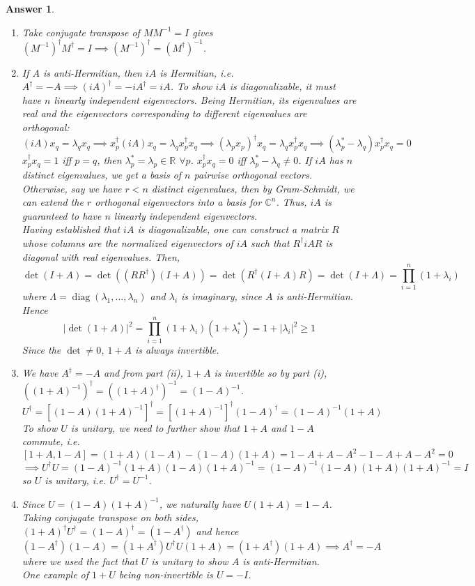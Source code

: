\documentclass[a4paper]{article}
\DeclareMathOperator{\diag}{diag}
\newtheorem{ans}{Answer}[section]
\theoremstyle{new}
\begin{document}
\begin{ans}\leavevmode
\begin{enumerate}[label=(\roman*)]
\item Take conjugate transpose of $MM^{-1}=I$ gives $(M^{-1})^\dag M^\dag=I\implies (M^{-1})^\dag=(M^\dag)^{-1}$.
\item If $A$ is anti-Hermitian, then $iA$ is Hermitian, i.e. $A^\dag=-A\implies(iA)^\dag=-iA^\dag=iA$. To show $iA$ is diagonalizable, it must have $n$ linearly independent eigenvectors. Being Hermitian, its eigenvalues are real and the eigenvectors corresponding to different eigenvalues are orthogonal: 
$$(iA)x_q=\lambda_qx_q\implies x_p^\dag(iA)x_q=\lambda_qx_p^\dag x_q\implies(\lambda_p x_p)^\dag x_q=\lambda_qx_p^\dag x_q\implies(\lambda_p^*-\lambda_q)x_p^\dag x_q=0$$
$x_p^\dag x_q=1$ iff $p=q$, then $\lambda_p^*=\lambda_p\in\mathbb{R}$ $\forall p$. $x_p^\dag x_q=0$ iff $\lambda_p^*-\lambda_q\neq0$. If $iA$ has $n$ distinct eigenvalues, we get a basis of $n$ pairwise orthogonal vectors. Otherwise, say we have $r<n$ distinct eigenvalues, then by Gram-Schmidt, we can extend the $r$ orthogonal eigenvectors into a basis for $\mathbb{C}^n$. Thus, $iA$ is guaranteed to have $n$ linearly independent eigenvectors.\\[5pt]
Having established that $iA$ is diagonalizable, one can construct a matrix $R$ whose columns are the normalized eigenvectors of $iA$ such that $R^\dag iAR$ is diagonal with real eigenvalues. Then,
$$\det(I+A)=\det((RR^\dag)(I+A))=\det(R^\dag(I+A)R)=\det(I+\Lambda)=\prod_{i=1}^n(1+\lambda_i)$$
where $\Lambda=\diag(\lambda_1,...,\lambda_n)$ and $\lambda_i$ is imaginary, since $A$ is anti-Hermitian. Hence
$$|\det(1+A)|^2=\prod_{i=1}^n(1+\lambda_i)(1+\lambda_i^*)=1+|\lambda_i|^2\geq1$$
Since the $\det\neq0$, $1+A$ is always invertible.
\item We have $A^\dag=-A$ and from part (ii), $1+A$ is invertible so by part (i), $((1+A)^{-1})^\dag=((1+A)^\dag)^{-1}=(1-A)^{-1}$.
$$U^\dag=[(1-A)(1+A)^{-1}]^\dag=[(1+A)^{-1}]^\dag(1-A)^\dag=(1-A)^{-1}(1+A)$$
To show $U$ is unitary, we need to further show that $1+A$ and $1-A$ commute, i.e.
$$[1+A,1-A]=(1+A)(1-A)-(1-A)(1+A)=1-A+A-A^2-1-A+A-A^2=0$$
$$\implies U^\dag U=(1-A)^{-1}(1+A)(1-A)(1+A)^{-1}=(1-A)^{-1}(1-A)(1+A)(1+A)^{-1}=I$$
so $U$ is unitary, i.e. $U^\dag=U^{-1}$.
\item Since $U=(1-A)(1+A)^{-1}$, we naturally have $U(1+A)=1-A$. Taking conjugate transpose on both sides, $(1+A)^\dag U^\dag=(1-A)^\dag=(1-A^\dag)$ and hence
$$(1-A^\dag)(1-A)=(1+A^\dag)U^\dag U(1+A)=(1+A^\dag)(1+A)\implies A^\dag=-A$$
where we used the fact that $U$ is unitary to show $A$ is anti-Hermitian.\\[5pt]
One example of $1+U$ being non-invertible is $U=-I$.
\end{enumerate}
\end{ans}
\end{document}
